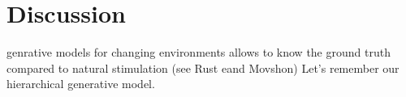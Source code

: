 \documentclass[profile,final,english,draft]{article}%
\newcommand{\citep}[1]{\parencite{#1}}
\newcommand{\citet}[1]{\textcite{#1}}
\begin{document}

\section{Discussion}

\label{sec:outro}

%
%

genrative models for changing environments allows to know the ground truth compared to natural stimulation (see Rust eand Movshon)%
Let's remember our hierarchical generative model.
\end{document}
